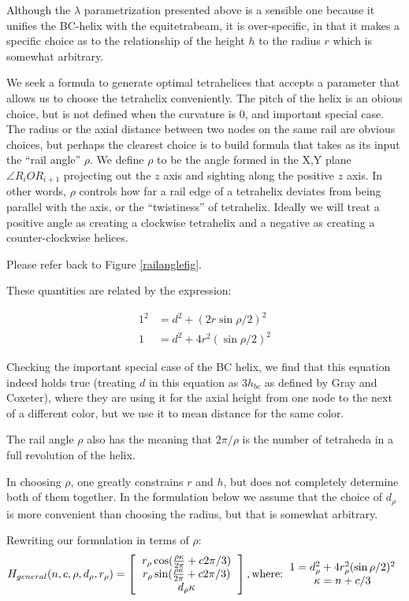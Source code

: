 \documentclass[11pt]{article}
\begin{document}
Although the $\lambda$ parametrization presented above is a sensible one
because it unifies the BC-helix with the equitetrabeam, it is over-specific,
in that it makes a specific choice as to the relationship of the height $h$
to the radius $r$ which is somewhat arbitrary.

We seek a formula to generate optimal tetrahelices that accepts a
parameter that allows us to choose the tetrahelix conveniently. The
pitch of the helix is an obious choice, but is not defined when the
curvature is $0$, and important special case. The radius or the axial
distance between two nodes on the same rail are obvious choices, but
perhaps the clearest choice is to build formula that takes as its
input the ``rail angle'' $\rho$. We define $\rho$ to be the angle
formed in the X,Y plane $\angle R_i O R_{i+1}$ projecting out the $z$
axis and sighting along the positive $z$ axis. In other words, $\rho$
controls how far a rail edge of a tetrahelix deviates from being
parallel with the axis, or the ``twistiness'' of tetrahelix. Ideally
we will treat a positive angle as creating a clockwise tetrahelix and
a negative as creating a counter-clockwise helices.


Please refer back to Figure \ref{railanglefig}.

 These quantities are related by the expression:

\begin{align*}
  1^2 &= d^2 + (2 r \sin{ \rho / 2})^2 \\
  1 &= d^2 + 4 r^2 (\sin{ \rho / 2})^2 
\end{align*}

Checking the important special case of the BC helix, we find that this equation
indeed holds true (treating $d$ in this equation as $3 h_{bc}$ as defined by
Gray and Coxeter), where they are using it for the axial height from one node to
the next of a different color, but we use it to mean distance for the same color.

The rail angle $\rho$ also has the meaning that $2 \pi / \rho$ is the number of
tetraheda in a full revolution of the helix.

In choosing $\rho$, one greatly constrains $r$ and $h$, but does not completely
determine both of them together. In the formulation below we assume that
the choice of $d_{\rho}$ is more convenient than choosing the radius,
but that is somewhat arbitrary.


Rewriting our formulation in terms of $\rho$:
\[
H_{general}(n,c,\rho,d_{\rho},r_{\rho}) =
\left [
  \begin{tabular}{c}
   $ r_{\rho} \cos(\frac{\rho \kappa}{2\pi} + c 2 \pi /3) $\\
   $ r_{\rho}  \sin(\frac{\rho \kappa}{2\pi} + c 2 \pi /3) $\\
   $ d_{\rho} \kappa $
  \end{tabular}
  \right ],
\text{where:}
\begin{tabular}{c}
  $   1 = d_{\rho}^2 + 4 r_{\rho}^2 (\sin{ \rho / 2})^2 $ \\
    $\kappa = n + c/3$ \\
  \end{tabular}      
\]
\end{document}
